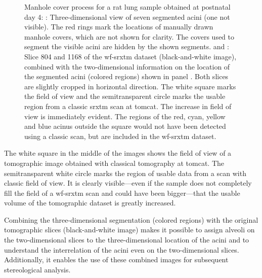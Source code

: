 \begin{figure}[htb]
{{%
			\label{subfig:manhole-1168}%
		}%
	}%
	\caption[Manhole cover process]{Manhole cover process for a rat lung sample obtained at postnatal day 4: : Three-dimensional view of seven segmented acini (one not visible). The red rings mark the locations of manually drawn manhole covers, which are not shown for clarity. The covers used to segment the visible acini are hidden by the shown segments.  and : Slice 804 and 1168 of the \ac{wf-srxtm} dataset (black-and-white image), combined with the two-dimensional information on the location of the segmented acini (colored regions) shown in panel . Both slices are slightly cropped in horizontal direction. The white square marks the field of view and the semitransparent circle marks the usable region from a classic \ac{srxtm} scan at \ac{tomcat}. The increase in field of view is immediately evident. The regions of the red, cyan, yellow and blue acinus outside the square would not have been detected using a classic scan, but are included in the \ac{wf-srxtm} dataset.}
	\label{fig:manhole cover}%
\end{figure}%

The white square in the middle of the images shows the field of view of a tomographic image obtained with classical tomography at \ac{tomcat}. The semitransparent white circle marks the region of usable data from a scan with classic field of view. It is clearly visible---even if the sample does not completely fill the field of a \ac{wf-srxtm} scan and could have been bigger---that the usable volume of the tomographic dataset is greatly increased.

Combining the three-dimensional segmentation (colored regions) with the original tomographic slices (black-and-white image) makes it possible to assign alveoli on the two-dimensional slices to the three-di\-men\-sion\-al location of the acini and to understand the interrelation of the acini even on the two-dimensional slices. Additionally, it enables the use of these combined images for subsequent stereological analysis.

